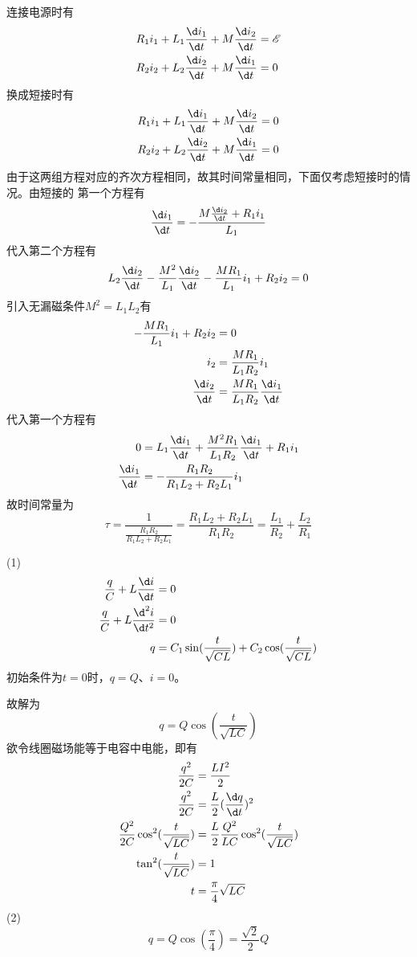 \documentclass{phyasgn}
\begin{document}
\begin{sol}[5-31]
    连接电源时有
    $$\begin{aligned}
        R_1i_1+L_1\frac{\d i_1}{\d t}+M\frac{\d i_2}{\d t}&=\mathscr{E}\\
        R_2i_2+L_2\frac{\d i_2}{\d t}+M\frac{\d i_1}{\d t}&=0
    \end{aligned}$$
    换成短接时有
    $$\begin{aligned}
        R_1i_1+L_1\frac{\d i_1}{\d t}+M\frac{\d i_2}{\d t}&=0\\
        R_2i_2+L_2\frac{\d i_2}{\d t}+M\frac{\d i_1}{\d t}&=0
    \end{aligned}$$
    由于这两组方程对应的齐次方程相同，故其时间常量相同，下面仅考虑短接时的情况。由短接的
    第一个方程有
    $$\frac{\d i_1}{\d t}=-\frac{M\frac{\d i_2}{\d t}+R_1i_1}{L_1}$$
    代入第二个方程有
    $$L_2\frac{\d i_2}{\d t}-\frac{M^2}{L_1}\frac{\d i_2}{\d t}-\frac{MR_1}{L_1}i_1+R_2i_2=0$$
    引入无漏磁条件$M^2=L_1L_2$有
    $$\begin{aligned}
        -\frac{MR_1}{L_1}i_1+R_2i_2&=0\\
        i_2&=\frac{MR_1}{L_1R_2}i_1\\
        \frac{\d i_2}{\d t}&=\frac{MR_1}{L_1R_2}\frac{\d i_1}{\d t}
    \end{aligned}$$
    代入第一个方程有
    $$\begin{aligned}
        0&=L_1\frac{\d i_1}{\d t}+\frac{M^2R_1}{L_1R_2}\frac{\d i_1}{\d t}+R_1i_1\\
        \frac{\d i_1}{\d t}&=-\frac{R_1R_2}{R_1L_2+R_2L_1}i_1\\
    \end{aligned}$$
    故时间常量为
    $$\tau=\frac{1}{\frac{R_1R_2}{R_1L_2+R_2L_1}}=\frac{R_1L_2+R_2L_1}{R_1R_2}=\frac{L_1}{R_2}+\frac{L_2}{R_1}$$
\end{sol}\par

\begin{sol}[5-32]
    (1)$$\begin{aligned}
        \frac{q}{C}+L\frac{\d i}{\d t}&=0\\
        \frac{q}{C}+L\frac{\d ^2i}{\d t^2}&=0\\
        q&=C_1\sin(\frac{t}{\sqrt{CL}})+C_2\cos(\frac{t}{\sqrt{CL}})
    \end{aligned}$$
    初始条件为$t=0$时，$q=Q$、$i=0$。\par
    故解为
    $$q=Q\cos(\frac{t}{\sqrt{LC}})$$
    欲令线圈磁场能等于电容中电能，即有
    $$\begin{aligned}
        \frac{q^2}{2C}&=\frac{LI^2}{2}\\
        \frac{q^2}{2C}&=\frac{L}{2}(\frac{\d q}{\d t})^2\\
        \frac{Q^2}{2C}\cos^2(\frac{t}{\sqrt{LC}})&=\frac{L}{2}\frac{Q^2}{LC}\cos^2(\frac{t}{\sqrt{LC}})\\
        \tan^2(\frac{t}{\sqrt{LC}})&=1\\
        t&=\frac{\pi}{4}\sqrt{LC}
    \end{aligned}$$
    (2)$$q=Q\cos(\frac{\pi}{4})=\frac{\sqrt{2}}{2}Q$$
\end{sol}\par
\end{document}
